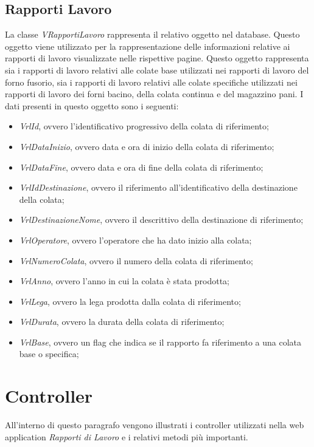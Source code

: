   \subsection{Rapporti Lavoro}
  La classe \textit{VRapportiLavoro} rappresenta il relativo oggetto nel database. Questo oggetto viene utilizzato per la
  rappresentazione delle informazioni relative ai rapporti di lavoro visualizzate nelle rispettive pagine.
  Questo oggetto rappresenta sia i rapporti di lavoro relativi alle colate base utilizzati nei rapporti di lavoro del forno
  fusorio, sia i rapporti di lavoro relativi alle colate specifiche utilizzati nei rapporti di lavoro dei forni bacino, della
  colata continua e del magazzino pani. I dati presenti in questo oggetto sono i seguenti:
  \begin{itemize}
    \item \textit{VrlId}, ovvero l'identificativo progressivo della colata di riferimento;
    \item \textit{VrlDataInizio}, ovvero data e ora di inizio della colata di riferimento;
    \item \textit{VrlDataFine}, ovvero data e ora di fine della colata di riferimento;
    \item \textit{VrlIdDestinazione}, ovvero il riferimento all'identificativo della destinazione della colata;
    \item \textit{VrlDestinazioneNome}, ovvero il descrittivo della destinazione di riferimento;
    \item \textit{VrlOperatore}, ovvero l'operatore che ha dato inizio alla colata;
    \item \textit{VrlNumeroColata}, ovvero il numero della colata di riferimento;
    \item \textit{VrlAnno}, ovvero l'anno in cui la colata è stata prodotta;
    \item \textit{VrlLega}, ovvero la lega prodotta dalla colata di riferimento;
    \item \textit{VrlDurata}, ovvero la durata della colata di riferimento;
    \item \textit{VrlBase}, ovvero un flag che indica se il rapporto fa riferimento a una colata base o specifica;
  \end{itemize}
  
  
  \section{Controller}
  All'interno di questo paragrafo vengono illustrati i controller utilizzati nella web application \textit{Rapporti di Lavoro}
  e i relativi metodi più importanti.

